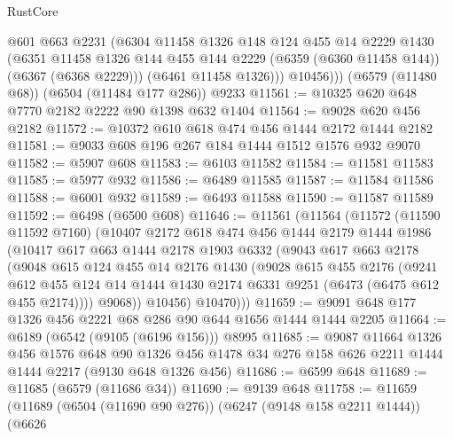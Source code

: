 \begin{lexlean}{RustCore}
\begin{coremodule}
            @601
            @663
            @2231
            (@6304
              @11458
              @1326
              @148
              @124
              @455
              @14
              @2229
              @1430
              (@6351
                @11458
                @1326
                @144
                @455
                @144
                @2229
                (@6359 (@6360 @11458 @144))
                (@6367 (@6368 @2229)))
              (@6461 @11458 @1326)))
          @10456)))
    (@6579 (@11480 @68))
    (@6504 (@11484 @177 @286))
    @9233
@11561 := @10325 @620 @648 @7770 @2182 @2222 @90 @1398 @632 @1404
@11564 := @9028 @620 @456 @2182
@11572 := @10372 @610 @618 @474 @456 @1444 @2172 @1444 @2182
@11581 := @9033 @608 @196 @267 @184 @1444 @1512 @1576 @932 @9070
@11582 := @5907 @608
@11583 := @6103 @11582
@11584 := @11581 @11583
@11585 := @5977 @932
@11586 := @6489 @11585
@11587 := @11584 @11586
@11588 := @6001 @932
@11589 := @6493 @11588
@11590 := @11587 @11589
@11592 := @6498 (@6500 @608)
@11646 := @11561
    (@11564
      (@11572
        (@11590 @11592 @7160)
        (@10407
          @2172
          @618
          @474
          @456
          @1444
          @2179
          @1444
          @1986
          (@10417
            @617
            @663
            @1444
            @2178
            @1903
            @6332
            (@9043
              @617
              @663
              @2178
              (@9048
                @615
                @124
                @455
                @14
                @2176
                @1430
                (@9028
                  @615
                  @455
                  @2176
                  (@9241
                    @612
                    @455
                    @124
                    @14
                    @1444
                    @1430
                    @2174
                    @6331
                    @9251
                    (@6473 (@6475 @612 @455 @2174))))
                @9068))
            @10456)
          @10470)))
@11659 := @9091 @648 @177 @1326 @456 @2221 @68 @286 @90 @644 @1656 @1444 @1444 @2205
@11664 := @6189 (@6542 (@9105 (@6196 @156))) @8995
@11685 := @9087
    @11664
    @1326
    @456
    @1576
    @648
    @90
    @1326
    @456
    @1478
    @34
    @276
    @158
    @626
    @2211
    @1444
    @1444
    @2217
    (@9130 @648 @1326 @456)
@11686 := @6599 @648
@11689 := @11685 (@6579 (@11686 @34))
@11690 := @9139 @648
@11758 := @11659
    (@11689
      (@6504 (@11690 @90 @276))
      (@6247 (@9148 @158 @2211 @1444))
      (@6626

\end{coremodule}
\end{lexlean}
